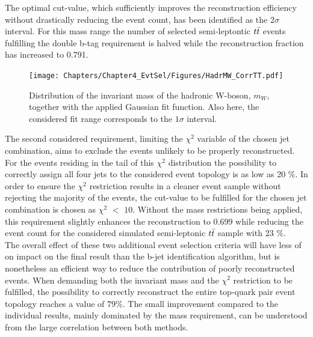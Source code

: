 The optimal cut-value, which sufficiently improves the reconstruction efficiency without drastically reducing the event count, has been identified as the $2\sigma$ interval. For this mass range the number of selected semi-leptontic $t\bar{t}$ events fulfilling the double b-tag requirement is halved while the reconstruction fraction has increased to 0.791.
\begin{figure}[h!t]
 \centering
 \texttt{[image: Chapters/Chapter4\_EvtSel/Figures/HadrMW\_CorrTT.pdf]}  %
 \caption{Distribution of the invariant mass of the hadronic W-boson, $m_{W}$, together with the applied Gaussian fit function. Also here, the considered fit range corresponds to the $1\sigma$ interval.} \label{fig::InvWMass}
\end{figure}

The second considered requirement, limiting the $\chi^{2}$ variable of the chosen jet combination, aims to exclude the events unlikely to be properly reconstructed.
For the events residing in the tail of this $\chi^{2}$ distribution the possibility to correctly assign all four jets to the considered event topology is as low as 20 $\%$.
In order to ensure the $\chi^{2}$ restriction results in a cleaner event sample without rejecting the majority of the events, the cut-value to be fulfilled for the chosen jet combination is chosen as $\chi^{2}$ $<$ $10$.
Without the mass restrictions being applied, this requirement slightly enhances the reconstruction to 0.699 while reducing the event count for the considered simulated semi-leptonic $t\bar{t}$ sample with 23 $\%$.
\\

The overall effect of these two additional event selection criteria will have less of on impact on the final result than the b-jet identification algorithm, but is nonetheless an efficient way to reduce the contribution of poorly reconstructed events.
When demanding both the invariant mass and the $\chi^{2}$ restriction to be fulfilled, the possibility to correctly reconstruct the entire top-quark pair event topology reaches a value of $79\%$.
The small improvement compared to the individual results, mainly dominated by the mass requirement, can be understood from the large correlation between both methods.

